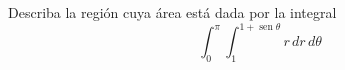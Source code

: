 \item Describa la región cuya área está dada por la integral
\[ \int_0^\pi \int_1^{1+\operatorname{sen}\theta} r \, dr \, d\theta \]
